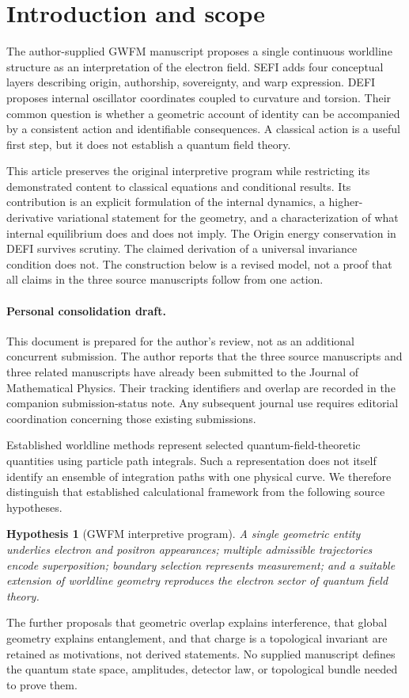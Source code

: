 \documentclass[aip,jmp,reprint,onecolumn,amsmath,amssymb]{revtex4-2}
\newtheorem{hypothesis}{Hypothesis}
\begin{document}
\section{Introduction and scope}
The author-supplied GWFM manuscript proposes a single continuous worldline structure as an interpretation of the electron field.\cite{gwfm} SEFI adds four conceptual layers describing origin, authorship, sovereignty, and warp expression.\cite{sefi} DEFI proposes internal oscillator coordinates coupled to curvature and torsion.\cite{defi} Their common question is whether a geometric account of identity can be accompanied by a consistent action and identifiable consequences. A classical action is a useful first step, but it does not establish a quantum field theory.

This article preserves the original interpretive program while restricting its demonstrated content to classical equations and conditional results. Its contribution is an explicit formulation of the internal dynamics, a higher-derivative variational statement for the geometry, and a characterization of what internal equilibrium does and does not imply. The Origin energy conservation in DEFI survives scrutiny. The claimed derivation of a universal invariance condition does not. The construction below is a revised model, not a proof that all claims in the three source manuscripts follow from one action.

\paragraph{Personal consolidation draft.} This document is prepared for the author's review, not as an additional concurrent submission. The author reports that the three source manuscripts and three related manuscripts have already been submitted to the Journal of Mathematical Physics. Their tracking identifiers and overlap are recorded in the companion submission-status note. Any subsequent journal use requires editorial coordination concerning those existing submissions.

Established worldline methods represent selected quantum-field-theoretic quantities using particle path integrals.\cite{strassler,schubert} Such a representation does not itself identify an ensemble of integration paths with one physical curve. We therefore distinguish that established calculational framework from the following source hypotheses.

\begin{hypothesis}[GWFM interpretive program]
A single geometric entity underlies electron and positron appearances; multiple admissible trajectories encode superposition; boundary selection represents measurement; and a suitable extension of worldline geometry reproduces the electron sector of quantum field theory.
\end{hypothesis}
The further proposals that geometric overlap explains interference, that global geometry explains entanglement, and that charge is a topological invariant are retained as motivations, not derived statements. No supplied manuscript defines the quantum state space, amplitudes, detector law, or topological bundle needed to prove them.
\end{document}
